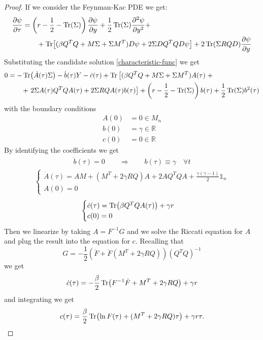 \begin{proof}
    If we consider the Feynman-Kac PDE we get:
    \begin{align*}
        \pdv{\psi}{\tau} &= \left(r-\frac{1}{2}-\Tr(\Sigma)\right)\pdv{\psi}{y} + \frac{1}{2}\Tr(\Sigma)\pdv[2]{\psi}{y} + \\
        &\qquad
        + \Tr[(\beta Q^TQ + M\Sigma + \Sigma M^T)D\psi + 2\Sigma DQ^TQD\psi] + 2\Tr(\Sigma RQD)\pdv{\psi}{y}
    \end{align*}
    Substituting the candidate solution \eqref{characteristic-func} we get
    \begin{align*}
        0 &= -\Tr(\dot{A}(\tau)\Sigma) - \dot{b}(\tau)Y - \dot{c}(\tau) + \Tr\left[(\beta Q^TQ + M\Sigma + \Sigma M^T)A(\tau)\right. + \\
        &\qquad
        + \left. 2\Sigma A(\tau)Q^TQA(\tau)+2\Sigma RQA(\tau)b(\tau)\right] + \left(r-\frac{1}{2}-\Tr(\Sigma)\right)b(\tau) + \frac{1}{2}\Tr(\Sigma)b^2(\tau)
    \end{align*}
    with the boundary conditions
    \begin{align*}
        A(0) &= 0 \in M_n \\
        b(0) &= \gamma \in \mathbb{R} \\
        c(0) &= 0 \in \mathbb{R}
    \end{align*}
    By identifying the coefficients we get
    \begin{align*}
        \dot{b}(\tau) = 0 \qquad\Rightarrow\qquad b(\tau) \equiv \gamma \quad\forall t
    \end{align*}
    \begin{align*}
        \begin{cases}
            \dot{A}(\tau) = AM + (M^T+2\gamma RQ)A + 2AQ^TQA + \frac{\gamma(\gamma-1)}{2}\mathds{1}_n \\
            A(0) = 0
        \end{cases}
    \end{align*}
    \begin{equation*}
        \begin{cases}
            \dot{c}(\tau) = \Tr(\beta Q^TQA(\tau)) + \gamma r \\
            c(0) = 0
        \end{cases}
    \end{equation*}
    Then we linearize by taking $A = F^{-1}G$ and we solve the Riccati equation for $A$ and plug the result into the equation for $c$. Recalling that
    \begin{equation*}
        G = -\frac{1}{2}\left(\dot{F}+\dot{F}(M^T+2\gamma RQ)\right)(Q^TQ)^{-1}
    \end{equation*}
    we get
    \begin{equation*}
        \dot{c}(\tau) = -\frac{\beta}{2}\Tr(F^{-1}\dot{F} + M^T + 2\gamma RQ) + \gamma r
    \end{equation*}
    and integrating we get
    \begin{align*}
        c(\tau) = \frac{\beta}{2}\Tr(\ln F(\tau)+(M^T+2\gamma RQ)\tau)+\gamma r\tau.
    \end{align*}
\end{proof}
